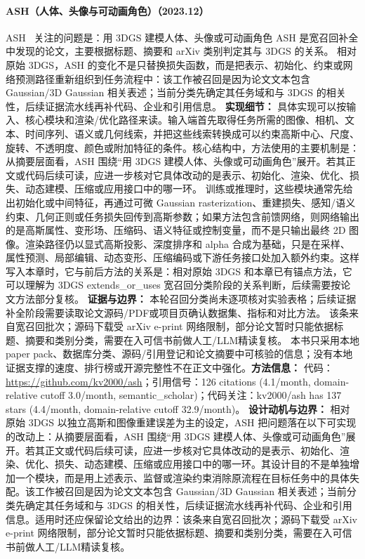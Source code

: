 \paragraph{ASH（人体、头像与可动画角色）（2023.12）}
ASH~\cite{2312_05941} 关注的问题是：用 3DGS 建模人体、头像或可动画角色 ASH 是宽召回补全中发现的论文，主要根据标题、摘要和 arXiv 类别判定其与 3DGS 的关系。
相对原始 3DGS，ASH 的变化不是只替换损失函数，而是把表示、初始化、约束或网络预测路径重新组织到任务流程中：该工作被召回是因为论文文本包含 Gaussian/3D Gaussian 相关表述；当前分类先确定其任务域和与 3DGS 的相关性，后续证据流水线再补代码、企业和引用信息。
\textbf{实现细节：} 具体实现可以按输入、核心模块和渲染/优化路径来读。输入端首先取得任务所需的图像、相机、文本、时间序列、语义或几何线索，并把这些线索转换成可以约束高斯中心、尺度、旋转、不透明度、颜色或附加特征的条件。核心结构中，方法使用的主要机制是：从摘要层面看，ASH 围绕“用 3DGS 建模人体、头像或可动画角色”展开。若其正文或代码后续可读，应进一步核对它具体改动的是表示、初始化、渲染、优化、损失、动态建模、压缩或应用接口中的哪一环。 训练或推理时，这些模块通常先给出初始化或中间特征，再通过可微 Gaussian rasterization、重建损失、感知/语义约束、几何正则或任务损失回传到高斯参数；如果方法包含前馈网络，则网络输出的是高斯属性、变形场、压缩码、语义特征或控制变量，而不是只输出最终 2D 图像。渲染路径仍以显式高斯投影、深度排序和 alpha 合成为基础，只是在采样、属性预测、局部编辑、动态变形、压缩编码或下游任务接口处加入额外约束。这样写入本章时，它与前后方法的关系是：相对原始 3DGS 和本章已有锚点方法，它可以理解为 3DGS extends\_or\_uses 宽召回分类阶段的关系判断，后续需要按论文方法部分复核。
\textbf{证据与边界：} 本轮召回分类尚未逐项核对实验表格；后续证据补全阶段需要读取论文源码/PDF或项目页确认数据集、指标和对比方法。 该条来自宽召回批次；源码下载受 arXiv e-print 网络限制，部分论文暂时只能依据标题、摘要和类别分类，需要在入可信书前做人工/LLM精读复核。 本书只采用本地 paper pack、数据库分类、源码/引用登记和论文摘要中可核验的信息；没有本地证据支撑的速度、排行榜或开源完整性不在正文中强化。\textbf{方法信息：} 代码：\url{https://github.com/kv2000/ash}；引用信号：126 citations (4.1/month, domain-relative cutoff 3.0/month, semantic\_scholar)；代码关注：kv2000/ash has 137 stars (4.4/month, domain-relative cutoff 32.9/month)。
\textbf{设计动机与边界：} 相对原始 3DGS 以独立高斯和图像重建误差为主的设定，ASH 把问题落在以下可实现的改动上：从摘要层面看，ASH 围绕“用 3DGS 建模人体、头像或可动画角色”展开。若其正文或代码后续可读，应进一步核对它具体改动的是表示、初始化、渲染、优化、损失、动态建模、压缩或应用接口中的哪一环。其设计目的不是单独增加一个模块，而是用上述表示、监督或渲染约束消除原流程在目标任务中的具体失配。该工作被召回是因为论文文本包含 Gaussian/3D Gaussian 相关表述；当前分类先确定其任务域和与 3DGS 的相关性，后续证据流水线再补代码、企业和引用信息。适用时还应保留论文给出的边界：该条来自宽召回批次；源码下载受 arXiv e-print 网络限制，部分论文暂时只能依据标题、摘要和类别分类，需要在入可信书前做人工/LLM精读复核。
